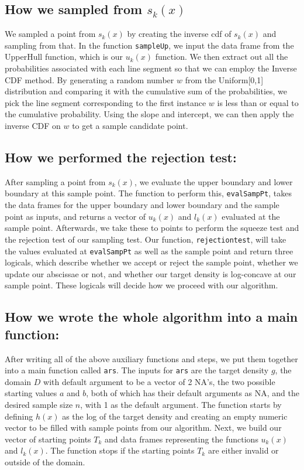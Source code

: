 \documentclass[12pt]{article}
\begin{document}
\subsection*{How we sampled from $s_k(x)$}

We sampled a point from $s_k(x)$ by creating the inverse cdf of $s_k(x)$ and sampling from that.  In the function \texttt{sampleUp}, we input the data frame from the UpperHull function, which is our $u_k(x)$ function. We then extract out all the probabilities associated with each line segment so that we can employ the Inverse CDF method.  By generating a random number $w$ from the Uniform[0,1] distribution and comparing it with the cumulative sum of the probabilities, we pick the line segment corresponding to the first instance $w$ is less than or equal to the cumulative probability.  Using the slope and intercept, we can then apply the inverse CDF on $w$ to get a sample candidate point.

\subsection*{How we performed the rejection test:}

After sampling a point from $s_k(x)$, we evaluate the upper boundary and lower boundary at this sample point.  The function to perform this, \texttt{evalSampPt}, takes the data frames for the upper boundary and lower boundary and the sample point as inputs, and returns a vector of $u_k(x)$ and $l_k(x)$ evaluated at the sample point.  Afterwards, we take these to points to perform the squeeze test and the rejection test of our sampling test.  Our function, \texttt{rejectiontest}, will take the values evaluated at \texttt{evalSampPt} as well as the sample point and return three logicals, which describe whether we accept or reject the sample point, whether we update our abscissae or not, and whether our target density is log-concave at our sample point.  These logicals will decide how we proceed with our algorithm.  

\subsection*{How we wrote the whole algorithm into a main function:}
After writing all of the above auxiliary functions and steps, we put them together into a main function called \texttt{ars}.  The inputs for \texttt{ars} are the target density $g$, the domain $D$ with default argument to be a vector of 2 NA's, the two possible starting values $a$ and $b$, both of which has their default arguments as NA, and the desired sample size $n$, with 1 as the default argument.  The function starts by defining $h(x)$ as the log of the target density and creating an empty numeric vector to be filled with sample points from our algorithm.  Next, we build our vector of starting points $T_k$ and data frames representing the functions $u_k(x)$ and $l_k(x)$.  The function stops if the starting points $T_k$ are either invalid or outside of the domain.  \\
\end{document}
